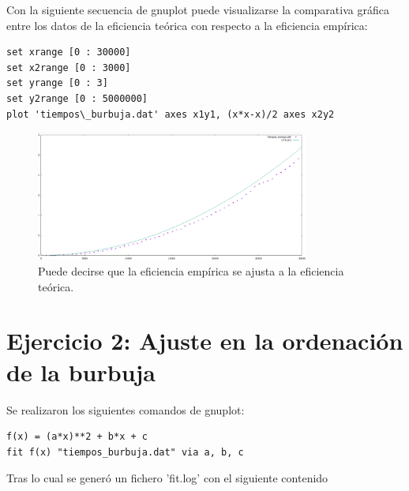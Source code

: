 \documentclass[paper=a4, fontsize=10pt]{scrartcl} %
\begin{document}
Con la siguiente secuencia de gnuplot puede visualizarse la comparativa gráfica entre los datos de la eficiencia teórica con respecto a la eficiencia empírica:

\begin{lstlisting}
set xrange [0 : 30000]
set x2range [0 : 3000]
set yrange [0 : 3]
set y2range [0 : 5000000]
plot 'tiempos\_burbuja.dat' axes x1y1, (x*x-x)/2 axes x2y2
\end{lstlisting}
\begin{figure}[H] %
	\centering
	\label{lsblk}
	\includegraphics[width=0.8\textwidth]{../imgs/c2.PNG}
	\caption{Puede decirse que la eficiencia empírica se ajusta a la eficiencia teórica.} 
\end{figure}

\section{ Ejercicio 2: Ajuste en la ordenación de la burbuja}

Se realizaron los siguientes comandos de gnuplot:

\begin{lstlisting}
f(x) = (a*x)**2 + b*x + c
fit f(x) "tiempos_burbuja.dat" via a, b, c
\end{lstlisting}

Tras lo cual se generó un fichero 'fit.log' con el siguiente contenido
\end{document}
